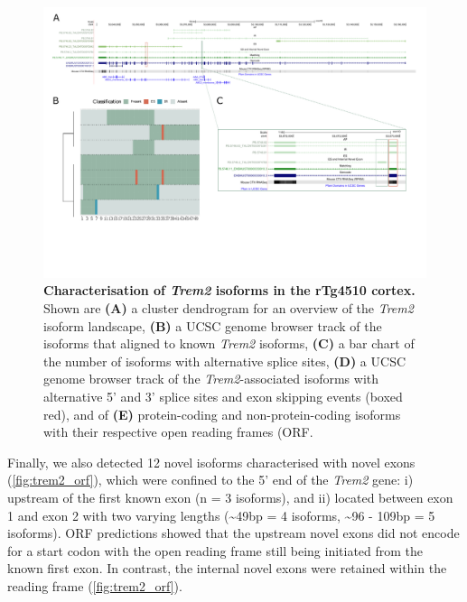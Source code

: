 \begin{landscape}
	\begin{figure}[htp]
		\centering
		\captionsetup{width=1.3\textwidth}
		\includegraphics[page=12,trim={0 2cm 0 0},scale = 0.8]{Figures/TargetGenes_Annotation_Landscape.pdf}
		\caption[Characterisation of the \textit{Trem2} isoform landscape]%
		{\textbf{Characterisation of \textit{Trem2} isoforms in the rTg4510 cortex.} Shown are \textbf{(A)} a cluster dendrogram for an overview of the \textit{Trem2} isoform landscape, \textbf{(B)} a UCSC genome browser track of the isoforms that aligned to known \textit{Trem2} isoforms, \textbf{(C)} a bar chart of the number of isoforms with alternative splice sites, \textbf{(D)} a UCSC genome browser track of the \textit{Trem2}-associated isoforms with alternative 5' and 3' splice sites and exon skipping events (boxed red), and of \textbf{(E)} protein-coding and non-protein-coding isoforms with their respective open reading frames (ORF.}    
		\label{fig:trem2}
	\end{figure}
\end{landscape}
\restoregeometry 

Finally, we also detected 12 novel isoforms characterised with novel exons (\cref{fig:trem2_orf}), which were confined to the 5' end of the \textit{Trem2} gene: i)  upstream of the first known exon (n = 3 isoforms), and ii) located between exon 1 and exon 2 with two varying lengths (\textasciitilde49bp = 4 isoforms, \textasciitilde96 - 109bp = 5 isoforms). ORF predictions showed that the upstream novel exons did not encode for a start codon with the open reading frame still being initiated from the known first exon. In contrast, the internal novel exons were retained within the reading frame (\cref{fig:trem2_orf}). 

